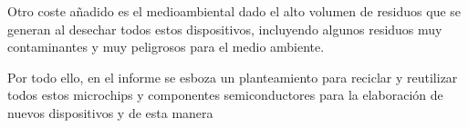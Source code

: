 Otro coste añadido es el medioambiental dado el alto volumen de residuos que se generan al desechar todos estos dispositivos, incluyendo algunos residuos muy contaminantes y muy peligrosos para el medio ambiente.

Por todo ello, en el informe \cite{reusing-silicon} se esboza un planteamiento para reciclar y reutilizar todos estos microchips y componentes semiconductores para la elaboración de nuevos dispositivos y de esta manera 